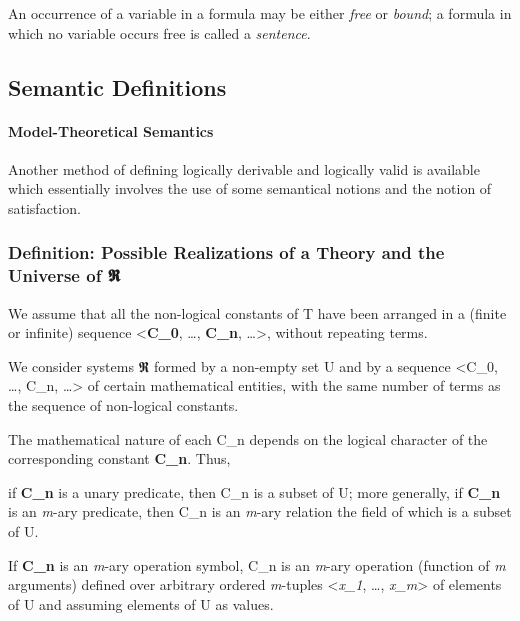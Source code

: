 An occurrence of a variable in a formula may be either \emph{free} or
\emph{bound}; a formula in which no variable occurs free is called a
\emph{sentence}.

\hypertarget{semantic-definitions}{%
\subsection{Semantic Definitions}\label{semantic-definitions}}

\hypertarget{model-theoretical-semantics}{%
\paragraph{Model-Theoretical
Semantics}\label{model-theoretical-semantics}}

Another method of defining logically derivable and logically valid is
available which essentially involves the use of some semantical notions
and the notion of satisfaction.

\hypertarget{definition-possible-realizations-of-a-theory-and-the-universe-of-ux1d57d}{%
\subsubsection{Definition: Possible Realizations of a Theory and the
Universe of
𝕽}\label{definition-possible-realizations-of-a-theory-and-the-universe-of-ux1d57d}}

We assume that all the non-logical constants of T have been arranged in
a (finite or infinite) sequence \textless{}\textbf{C\_0}, \ldots,
\textbf{C\_n}, \ldots\textgreater, without repeating terms.

We consider systems 𝕽 formed by a non-empty set U and by a sequence
\textless C\_0, \ldots, C\_n, \ldots\textgreater{} of certain
mathematical entities, with the same number of terms as the sequence of
non-logical constants.

The mathematical nature of each C\_n depends on the logical character of
the corresponding constant \textbf{C\_n}. Thus,

if \textbf{C\_n} is a unary predicate, then C\_n is a subset of U; more
generally, if \textbf{C\_n} is an \emph{m}-ary predicate, then C\_n is
an \emph{m}-ary relation the field of which is a subset of U.

If \textbf{C\_n} is an \emph{m}-ary operation symbol, C\_n is an
\emph{m}-ary operation (function of \emph{m} arguments) defined over
arbitrary ordered \emph{m}-tuples \textless{}\emph{x\_1}, \ldots,
\emph{x\_m}\textgreater{} of elements of U and assuming elements of U as
values.

